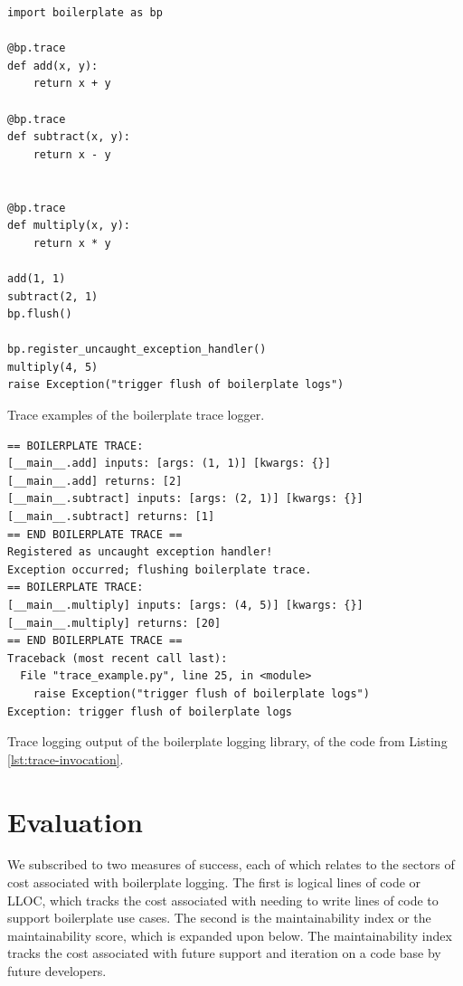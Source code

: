 \documentclass[acmsmall,review,authorversion]{acmart}
\begin{document}
\begin{listing}[H]
    \begin{verbatim}
import boilerplate as bp

@bp.trace
def add(x, y):
    return x + y

@bp.trace
def subtract(x, y):
    return x - y


@bp.trace
def multiply(x, y):
    return x * y

add(1, 1)
subtract(2, 1)
bp.flush()

bp.register_uncaught_exception_handler()
multiply(4, 5)
raise Exception("trigger flush of boilerplate logs")
    \end{verbatim}
    \caption{Trace examples of the boilerplate trace logger.}
    \label{lst:trace-invocation}
\end{listing}


\begin{listing}[H]
    \begin{verbatim}
== BOILERPLATE TRACE:
[__main__.add] inputs: [args: (1, 1)] [kwargs: {}]
[__main__.add] returns: [2]
[__main__.subtract] inputs: [args: (2, 1)] [kwargs: {}]
[__main__.subtract] returns: [1]
== END BOILERPLATE TRACE ==
Registered as uncaught exception handler!
Exception occurred; flushing boilerplate trace.
== BOILERPLATE TRACE:
[__main__.multiply] inputs: [args: (4, 5)] [kwargs: {}]
[__main__.multiply] returns: [20]
== END BOILERPLATE TRACE ==
Traceback (most recent call last):
  File "trace_example.py", line 25, in <module>
    raise Exception("trigger flush of boilerplate logs")
Exception: trigger flush of boilerplate logs
    \end{verbatim}
    \caption{Trace logging output of the boilerplate logging library, of the code from Listing \ref{lst:trace-invocation}.}
    \label{lst:trace-log-examples}
\end{listing}


\section{Evaluation}

We subscribed to two measures of success, each of which relates to the sectors of cost associated with boilerplate logging. The first is logical lines of code or LLOC, which tracks the cost associated with needing to write lines of code to support boilerplate use cases. The second is the maintainability index or the maintainability score, which is expanded upon below. The maintainability index tracks the cost associated with future support and iteration on a code base by future developers.
\end{document}
